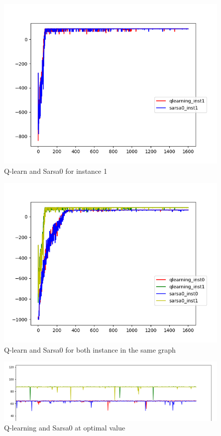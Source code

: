 \documentclass{article}
\begin{document}
\begin{figure}[H]
  \centering
  \includegraphics[scale=0.5]{images/qlearn_sarsa0_instance1}
  \caption{Q-learn and Sarsa0 for instance 1}
  \label{fig:ins1}
\end{figure}

\begin{figure}[H]
  \centering
  \includegraphics[scale=0.5]{images/qlearn_sarsa0_instance_0_1}
  \caption{Q-learn and Sarsa0 for both instance in the same graph}
  \label{fig:qls0}
\end{figure}

\begin{figure}[H]
  \centering
  \includegraphics[scale=0.25]{images/close_up_ql_s0_ins0_1}
  \caption{Q-learning and Sarsa0 at optimal value}
  \label{fig:qls0c}
\end{figure}
\end{document}
